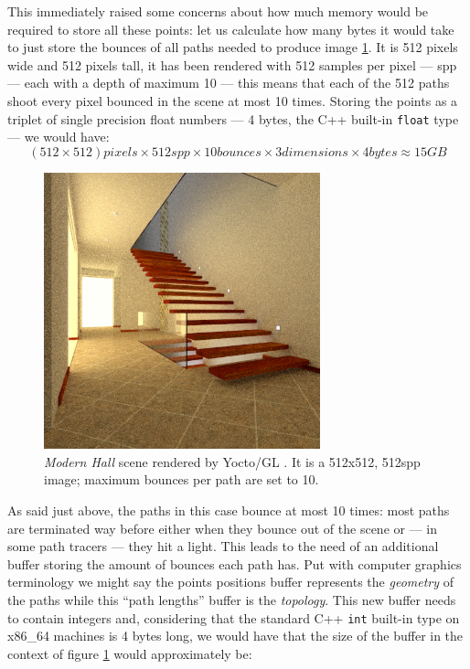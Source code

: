 This immediately raised some concerns about how much memory would be required to store all these points: let us calculate how many bytes it would take to just store the bounces of all paths needed to produce image \ref{hall_render}. It is 512 pixels wide and 512 pixels tall, it has been rendered with 512 samples per pixel --- spp --- each with a depth of maximum 10 --- this means that each of the 512 paths shoot every pixel bounced in the scene at most 10 times. Storing the points as a triplet of single precision float numbers --- 4 bytes, the C++ built-in \texttt{float} type ---  we would have:
\begin{equation}
	\label{rough_bounce_size_estimation}
	(512 \times 512) pixels \times 512 spp \times 10 bounces \times 3 dimensions \times 4 bytes \approx 15GB
\end{equation}
\begin{figure}
	\centering
	\includegraphics[height=8cm]{chapters/chapter_thetool/hall}
	\caption{\textit{Modern Hall} scene \cite{bitterliscenes} rendered by Yocto/GL \cite{pellacini2019yocto}. It is a 512x512, 512spp image; maximum bounces per path are set to 10.}
	\label{hall_render}
\end{figure}
As said just above, the paths in this case bounce at most 10 times: most paths are terminated way before either when they bounce out of the scene or --- in some path tracers --- they hit a light. This leads to the need of an additional buffer storing the amount of bounces each path has. Put with computer graphics terminology we might say the points positions buffer represents the \textit{geometry} of the paths while this “path lengths” buffer is the \textit{topology}. 
This new buffer needs to contain integers and, considering that the standard C++ \texttt{int} built-in type on x86\_64 machines is 4 bytes long, we would have that the size of the buffer in the context of figure \ref{hall_render} would approximately be:
